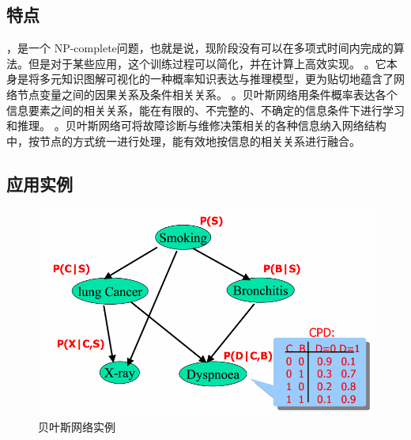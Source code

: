 \subsection*{特点}
\begin{frame}
	\begin{itemize}
		，是一个 NP-complete问题，也就是说，现阶段没有可以在多项式时间内完成的算法。但是对于某些应用，这个训练过程可以简化，并在计算上高效实现。
		。它本身是将多元知识图解可视化的一种概率知识表达与推理模型，更为贴切地蕴含了网络节点变量之间的因果关系及条件相关关系。
		。贝叶斯网络用条件概率表达各个信息要素之间的相关关系，能在有限的、不完整的、不确定的信息条件下进行学习和推理。
		。贝叶斯网络可将故障诊断与维修决策相关的各种信息纳入网络结构中，按节点的方式统一进行处理，能有效地按信息的相关关系进行融合。
	\end{itemize}
\end{frame}

\subsection*{应用实例}
\begin{frame}
\begin{figure}
		\centering
		\includegraphics[scale=0.3]{pic/instance.png}
		\caption{贝叶斯网络实例}
		\label{0-005}
\end{figure}
\end{frame}

